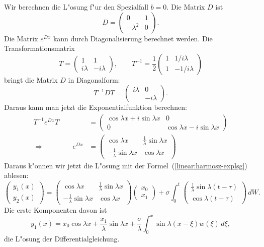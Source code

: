 \begin{beispiel}
Wir berechnen die L"osung f"ur den Spezialfall $b=0$.
Die Matrix $D$ ist
\[
D=\begin{pmatrix}
0&1\\-\lambda^2&0
\end{pmatrix}.
\]
Die Matrix $e^{Dx}$ kann durch Diagonalisierung berechnet werden.
Die Transformationsmatrix
\[
T
=
\begin{pmatrix}
1&1\\
i\lambda&-i\lambda
\end{pmatrix},
\qquad
T^{-1}
=
\frac12
\begin{pmatrix}
1& 1/i\lambda\\
1&-1/i\lambda
\end{pmatrix}
\]
bringt die Matrix $D$ in Diagonalform:
\[
T^{-1}DT
=
\begin{pmatrix}
i\lambda&        0\\
        &-i\lambda
\end{pmatrix}.
\]
Daraus kann man jetzt die Exponentialfunktion berechnen:
\begin{align*}
T^{-1}e^{Dx}T
&=
\begin{pmatrix}
\cos\lambda x+i\sin\lambda x&              0             \\
              0             &\cos\lambda x-i\sin\lambda x
\end{pmatrix}
\\
\Rightarrow\qquad\qquad
e^{Dx}
&=
\begin{pmatrix}
                \cos\lambda x&\frac1{\lambda}\sin\lambda x\\
-\frac1{\lambda}\sin\lambda x&               \cos\lambda x
\end{pmatrix}
\end{align*}
Daraus k"onnen wir jetzt die L"osung mit der
Formel~(\ref{linear:harmosz-explsg}) ablesen:
\begin{equation}
\begin{pmatrix}
y_1(x)\\y_2(x)
\end{pmatrix}
=
\begin{pmatrix}
                \cos\lambda x&\frac1{\lambda}\sin\lambda x\\
-\frac1{\lambda}\sin\lambda x&               \cos\lambda x
\end{pmatrix}
\begin{pmatrix}x_0\\x_1\end{pmatrix}
+
\sigma\int_0^t
\begin{pmatrix}
\frac1{\lambda}\sin\lambda(t-\tau)\\
               \cos\lambda(t-\tau)
\end{pmatrix}\,dW.
\end{equation}
Die erste Komponenten davon ist
\begin{equation}
y_1(x)
=
x_0\cos\lambda x+\frac{x_1}{\lambda}\sin\lambda x
+
\frac{\sigma}{\lambda}\int_0^x\sin\lambda(x-\xi)w(\xi)\,d\xi,
\label{linear:harmosz-y}
\end{equation}
die L"osung der Differentialgleichung.
\end{beispiel}

